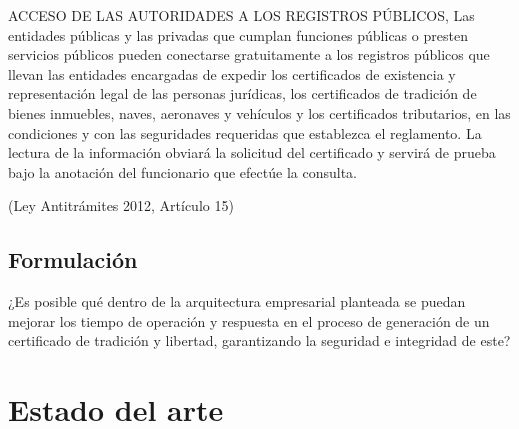 \begin{center}
    \begin{minipage}{0.9\linewidth}
        \vspace{5pt}%
        {\small

ACCESO DE LAS AUTORIDADES A LOS REGISTROS PÚBLICOS,
Las entidades públicas y las privadas que cumplan funciones públicas o
presten servicios públicos pueden conectarse gratuitamente a los registros públicos
que llevan las entidades encargadas de expedir los certificados de existencia y
representación legal de las personas jurídicas, los certificados de tradición de bienes
inmuebles, naves, aeronaves y vehículos y los certificados tributarios, en las
condiciones y con las seguridades requeridas que establezca el reglamento. La
lectura de la información obviará la solicitud del certificado y servirá de prueba bajo
la anotación del funcionario que efectúe la consulta.
        }
        \begin{flushright}
            (Ley Antitrámites 2012, Artículo 15)
        \end{flushright}
        \vspace{5pt}%
    \end{minipage}
\end{center}





  

\subsection{Formulación}
¿Es posible qué dentro de la arquitectura empresarial planteada se puedan mejorar los tiempo de operación y respuesta en el proceso de generación de un certificado de tradición y libertad, garantizando la seguridad e integridad de este?

\section{Estado del arte}

